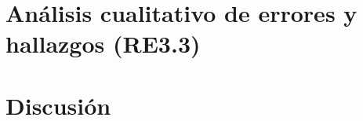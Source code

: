 \section{Análisis cualitativo de errores y hallazgos (RE3.3)}
\label{sec:re33}
%
%
%

\section{Discusión}
\label{sec:discusion-oe3}
